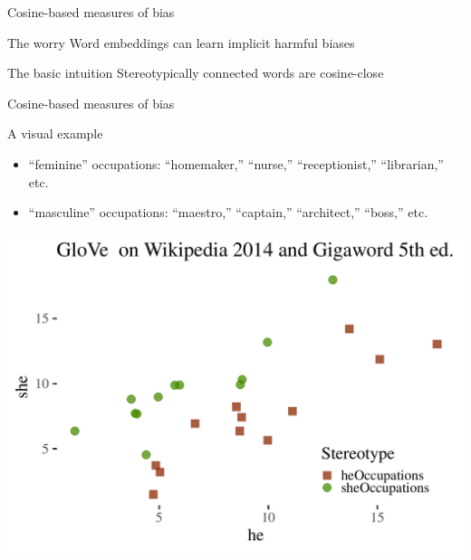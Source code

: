 \documentclass[
  10pt,
  ignorenonframetext,
  x11names, dvipsnames, bibspacing,natbib, table]{beamer}
\begin{document}
\begin{frame}{Cosine-based measures of bias}
\protect\hypertarget{cosine-based-measures-of-bias}{}
\begin{block}{The worry}
\protect\hypertarget{the-worry}{}
Word embeddings can learn implicit harmful biases

\pause
\end{block}

\begin{block}{The basic intuition}
\protect\hypertarget{the-basic-intuition}{}
Stereotypically connected words are cosine-close
\end{block}
\end{frame}

\begin{frame}{Cosine-based measures of bias}
\protect\hypertarget{cosine-based-measures-of-bias-1}{}
\begin{block}{A visual example}
\protect\hypertarget{a-visual-example}{}
\footnotesize

\begin{itemize}
\item
  ``feminine'' occupations: ``homemaker,'' ``nurse,'' ``receptionist,''
  ``librarian,'' etc.
\item
  ``masculine'' occupations: ``maestro,'' ``captain,'' ``architect,''
  ``boss,'' etc.
\end{itemize}

\normalsize

\vspace{1mm}
\footnotesize

\begin{center}\includegraphics[width=0.6\linewidth]{presentationBoston_files/figure-beamer/unnamed-chunk-1-1} \end{center}
\normalsize
\end{block}
\end{frame}
\end{document}
